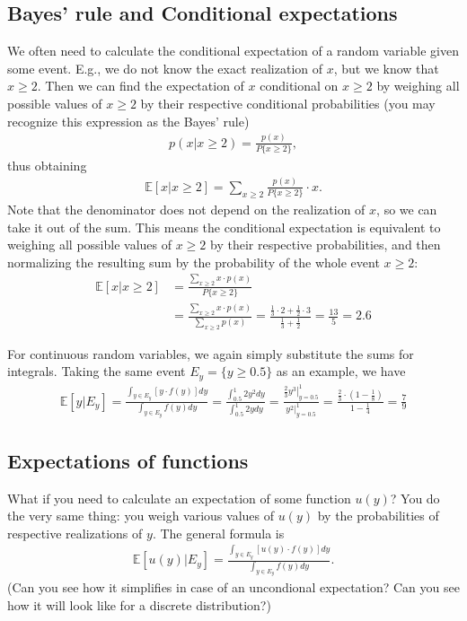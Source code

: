 \documentclass{article}
\begin{document}
\subsection{Bayes' rule and Conditional expectations}

We often need to calculate the conditional expectation of a random variable given some event. E.g., we do not know the exact realization of $x$, but we know that $x \geq 2$. Then we can find the expectation of $x$ conditional on $x \geq 2$ by weighing all possible values of $x \geq 2$ by their respective conditional probabilities (you may recognize this expression as the Bayes' rule)
\begin{align*}
	p(x|x\geq 2) = \frac{p(x)}{P\{x \geq 2\}},
\end{align*}
thus obtaining 
\begin{align*}
	\mathbb{E}[x|x\geq 2] = \sum_{x\geq 2} \frac{p(x)}{P\{x\geq 2\}} \cdot x.
\end{align*}
Note that the denominator does not depend on the realization of $x$, so we can take it out of the sum. This means the conditional expectation is equivalent to weighing all possible values of $x \geq 2$ by their respective probabilities, and then normalizing the resulting sum by the probability of the whole event $x \geq 2$:
\begin{align*}
	\mathbb{E}[x|x\geq 2] &= \frac{\sum_{x\geq 2} x \cdot p(x)}{P\{x\geq 2\}} 
	\\
	&= \frac{\sum_{x\geq 2} x \cdot p(x)}{\sum_{x\geq 2} p(x)} = \frac{\frac{1}{3}\cdot 2 + \frac{1}{2} \cdot 3}{\frac{1}{3} + \frac{1}{2}} = \frac{13}{5} = 2.6
\end{align*}

For continuous random variables, we again simply substitute the sums for integrals. Taking the same event $E_y = \{y \geq 0.5\}$ as an example, we have
\begin{align*}
	\mathbb{E}[y|E_y] 
	= \frac{\int_{y \in E_y} \left[y \cdot f(y)\right] dy}{\int_{y \in E_y} f(y) dy} 
	= \frac{\int_{0.5}^1 2y^2 dy}{\int_{0.5}^1 2y dy} 
	= \frac{\left.\frac{2}{3} y^3\right|_{y=0.5}^1}{y^2|_{y=0.5}^1} 
	= \frac{\frac{2}{3}\cdot \left(1-\frac{1}{8}\right)}{1-\frac{1}{4}}
	= \frac{7}{9}
\end{align*}


\subsection{Expectations of functions}

What if you need to calculate an expectation of some function $u(y)$? You do the very same thing: you weigh various values of $u(y)$ by the probabilities of respective realizations of $y$. The general formula is
\begin{align*}
	\mathbb{E}[u(y)|E_y]
	= \frac{\int_{y \in E_y} \left[u(y) \cdot f(y)\right] dy}{\int_{y \in E_y} f(y) dy}.
\end{align*}
(Can you see how it simplifies in case of an uncondional expectation? Can you see how it will look like for a discrete distribution?)
\end{document}
